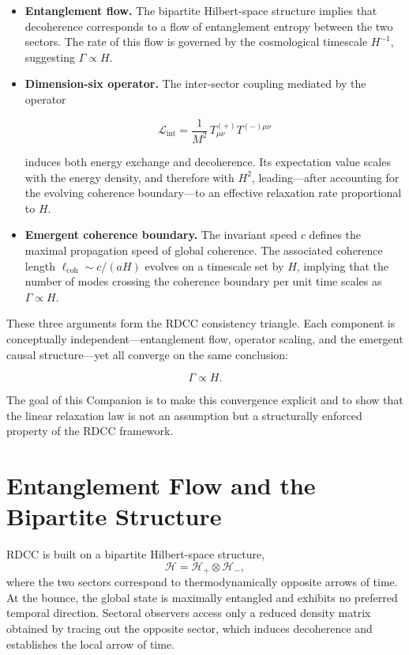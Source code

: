 \documentclass[11pt,a4paper]{article}
\begin{document}
\begin{itemize}
    \item \textbf{Entanglement flow.}  
    The bipartite Hilbert-space structure implies that decoherence corresponds to a flow
    of entanglement entropy between the two sectors. The rate of this flow is governed
    by the cosmological timescale $H^{-1}$, suggesting $\Gamma \propto H$.

    \item \textbf{Dimension-six operator.}  
    The inter-sector coupling mediated by the operator
    

\[
        \mathcal{L}_{\mathrm{int}}
        = \frac{1}{M^{2}}\, T^{(+)}_{\mu\nu} T^{(-)\mu\nu}
    \]


    induces both energy exchange and decoherence. Its expectation value scales with the
    energy density, and therefore with $H^{2}$, leading—after accounting for the evolving
    coherence boundary—to an effective relaxation rate proportional to $H$.

    \item \textbf{Emergent coherence boundary.}  
    The invariant speed $c$ defines the maximal propagation speed of global coherence.
    The associated coherence length $\ell_{\mathrm{coh}} \sim c/(aH)$ evolves on a timescale set
    by $H$, implying that the number of modes crossing the coherence boundary per
    unit time scales as $\Gamma \propto H$.
\end{itemize}

These three arguments form the RDCC consistency triangle. Each component is
conceptually independent—entanglement flow, operator scaling, and the emergent causal
structure—yet all converge on the same conclusion:


\[
    \Gamma \propto H.
\]



The goal of this Companion is to make this convergence explicit and to show that the
linear relaxation law is not an assumption but a structurally enforced property of the
RDCC framework.

\section{Entanglement Flow and the Bipartite Structure}

RDCC is built on a bipartite Hilbert-space structure,
\begin{equation}
    \mathcal{H} = \mathcal{H}_{+} \otimes \mathcal{H}_{-},
\end{equation}
where the two sectors correspond to thermodynamically opposite arrows of time. At the
bounce, the global state is maximally entangled and exhibits no preferred temporal
direction. Sectoral observers access only a reduced density matrix obtained by tracing
out the opposite sector, which induces decoherence and establishes the local arrow of
time.
\end{document}
